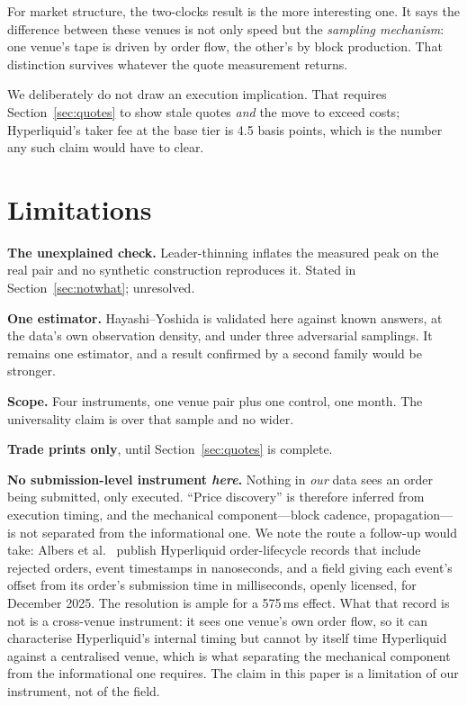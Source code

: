 \documentclass[11pt,a4paper]{article}
\begin{document}
For market structure, the two-clocks result is the more interesting one. It says the difference
between these venues is not only speed but the \emph{sampling mechanism}: one venue's tape is
driven by order flow, the other's by block production. That distinction survives whatever the
quote measurement returns.

We deliberately do not draw an execution implication. That requires Section~\ref{sec:quotes} to
show stale quotes \emph{and} the move to exceed costs; Hyperliquid's taker fee at the base tier is
4.5 basis points, which is the number any such claim would have to clear.

\section{Limitations}

\textbf{The unexplained check.} Leader-thinning inflates the measured peak on the real pair and no
synthetic construction reproduces it. Stated in Section~\ref{sec:notwhat}; unresolved.

\textbf{One estimator.} Hayashi--Yoshida is validated here against known answers, at the data's own
observation density, and under three adversarial samplings. It remains one estimator, and a
result confirmed by a second family would be stronger.

\textbf{Scope.} Four instruments, one venue pair plus one control, one month. The universality
claim is over that sample and no wider.

\textbf{Trade prints only}, until Section~\ref{sec:quotes} is complete.

\textbf{No submission-level instrument \emph{here}.} Nothing in \emph{our} data sees an order being
submitted, only executed. ``Price discovery'' is therefore inferred from execution timing, and the
mechanical component---block cadence, propagation---is not separated from the informational one.
We note the route a follow-up would take: Albers et al.~\cite{albers2026openbook} publish
Hyperliquid order-lifecycle records that include rejected orders, event timestamps in nanoseconds,
and a field giving each event's offset from its order's submission time in milliseconds, openly
licensed, for December 2025. The resolution is ample for a 575\,ms effect. What that record is not
is a cross-venue instrument: it sees one venue's own order flow, so it can characterise
Hyperliquid's internal timing but cannot by itself time Hyperliquid against a centralised venue,
which is what separating the mechanical component from the informational one requires. The claim in
this paper is a limitation of our instrument, not of the field.
\end{document}
